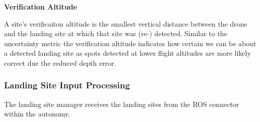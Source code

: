\textbf{Verification Altitude}

A site's verificaiton altitude is the smallest vertical distance between the drone and the landing site at which that site was (re-) detected. Similar to the uncertainty metric the verification altitude indicates how certain we can be about a detected landing site as spots detected at lower flight altitudes are more likely correct due the reduced depth error. 

\subsubsection{Landing Site Input Processing}
The landing site manager receives the landing sites from the ROS connector within the autonomy. 

\subsubsection{}

